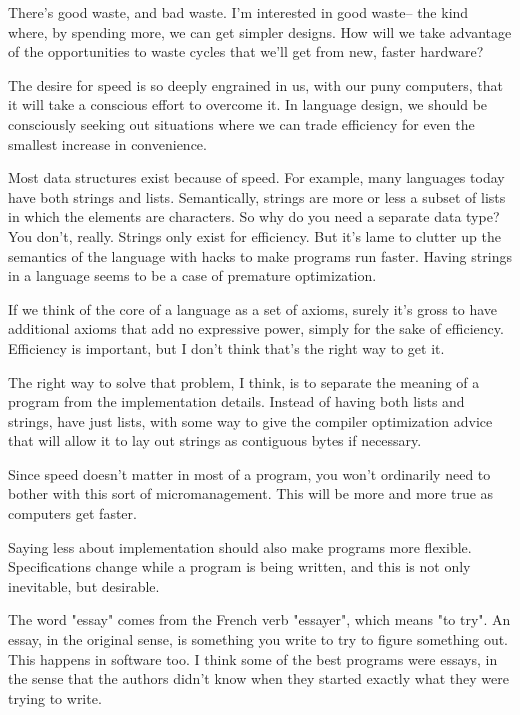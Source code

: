 There's good waste, and bad waste.  I'm interested
in good waste-- the kind where, by spending more, we can get  
simpler designs.  How will we take advantage of the opportunities
to waste cycles that we'll get from new, faster hardware?

The desire for speed is so deeply engrained in us, with 
our puny computers, that it will take a conscious effort
to overcome it.  In language design, we should be consciously seeking out
situations where we can trade efficiency for even the
smallest increase in convenience.



Most data structures exist because of speed.  For example,
many languages today have both strings and lists.  Semantically, strings
are more or less a subset of lists in which the elements are
characters.  So why do you need a separate data type?
You don't, really.  Strings only
exist for efficiency.  But it's lame to clutter up the semantics
of the language with hacks to make programs run faster.
Having strings in a language seems to be a case of
premature optimization.

If we think of the core of a language as a set of axioms,  
surely it's gross to have additional axioms that add no expressive
power, simply for the sake of efficiency.  Efficiency is
important, but I don't think that's the right way to get it.

The right way to solve that problem, I think, is to separate
the meaning of a program from the implementation details. 
Instead of having both lists and strings, have just lists,
with some way to give the compiler optimization advice that 
will allow it to lay out strings as contiguous bytes if
necessary.

Since speed doesn't matter in most of a program, you won't
ordinarily need to bother with
this sort of micromanagement.
This will be more and more true as computers get faster.



Saying less about implementation should also make programs
more flexible.
Specifications change while a program is being written, and this is not
only inevitable, but desirable.

The word "essay" comes
from the French verb "essayer", which means "to try".
An essay, in the original sense, is something you
write to try to figure something out.  This happens in
software too.  I think some of the best programs were essays,
in the sense that the authors didn't know when they started
exactly what they were trying to write.


